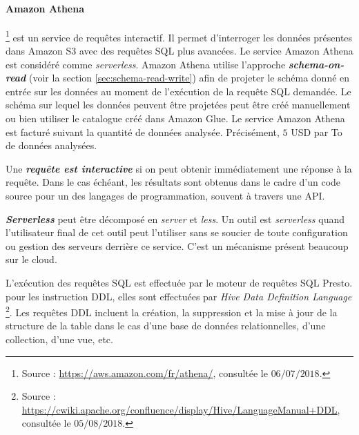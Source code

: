 \paragraph{Amazon Athena}\label{aws:athena}\footnote{Source : \url{https://aws.amazon.com/fr/athena/}, consultée le $06/07/2018$.} est un service de requêtes  interactif. Il permet d'interroger les données présentes dans Amazon S3 avec des requêtes SQL plus avancées. Le service Amazon Athena est considéré comme \textit{serverless}. Amazon Athena utilise l'approche \textbf{\textit{schema-on-read}} (voir la section \ref{sec:schema-read-write}) afin de projeter le schéma donné en entrée sur les données au moment de l'exécution de la requête SQL demandée. Le schéma sur lequel les données peuvent être projetées peut être créé manuellement ou bien utiliser le catalogue créé dans Amazon Glue.
Le service Amazon Athena est facturé suivant la quantité de données analysée. Précisément, $ 5 $ USD par To de données analysées.


\begin{tcolorbox}
	Une \textbf{\textit{requête est	interactive}} si on peut  obtenir immédiatement une réponse à la requête.  Dans le cas échéant, les résultats sont obtenus  dans le cadre d'un code source pour un des langages de programmation, souvent à travers une API.
\end{tcolorbox}

\begin{tcolorbox}
	\textbf{\textit{Serverless}} peut être décomposé en \textit{server} et \textit{less}. Un outil est \textit{serverless} quand l'utilisateur final de cet outil peut l'utiliser sans se soucier de toute configuration ou gestion des serveurs derrière ce service. C'est un mécanisme présent beaucoup sur le cloud.
\end{tcolorbox}

L'exécution des requêtes SQL est effectuée par le moteur de requêtes SQL Presto. pour les instruction DDL, elles sont effectuées par  \textit{Hive Data Definition Language} \footnote{Source : \url{https://cwiki.apache.org/confluence/display/Hive/LanguageManual+DDL}, consultée le $05/08/2018$.}. Les requêtes DDL incluent la création, la suppression et la mise à jour de la structure de la table dans le cas d'une base de données relationnelles, d'une collection, d'une vue, etc. 



